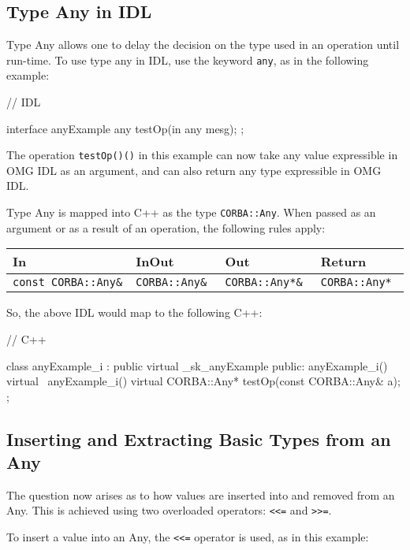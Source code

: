 \documentclass[11pt,twoside,a4paper]{book}
\newcommand{\type}[1]{\texttt{#1}}
\newcommand{\code}[1]{\texttt{#1}}
\newcommand{\op}[1]{\texttt{#1()}}
\begin{document}
\subsection{Type Any in IDL}
Type Any allows one to delay the decision on the type used in an
operation until run-time. To use type any in IDL, use the keyword
\code{any}, as in the following example:

\begin{idllisting}
// IDL

interface anyExample {
  any testOp(in any mesg);
};
\end{idllisting}


The operation \op{testOp()} in this example can now take any value
expressible in OMG IDL as an argument, and can also return any type
expressible in OMG IDL.

Type Any is mapped into C++ as the type \type{CORBA::Any}. When passed
as an argument or as a result of an operation, the following rules
apply:

\mbox{}

{\small
\begin{tabular}{llll}
{\bf In }                & {\bf InOut }       & {\bf Out }           & 
{\bf Return }                                                   \\ \hline
{\tt const CORBA::Any\& }& {\tt CORBA::Any\& }& {\tt CORBA::Any*\& } & 
{\tt CORBA::Any* }
\end{tabular}
}

\mbox{}

So, the above IDL would map to the following C++:

\begin{cxxlisting}
// C++

class anyExample_i : public virtual _sk_anyExample {
public:
  anyExample_i() { }
  virtual ~anyExample_i() { }
  virtual CORBA::Any* testOp(const CORBA::Any& a);
};
\end{cxxlisting}


\subsection{Inserting and Extracting Basic Types from an Any}

The question now arises as to how values are inserted into and removed
from an Any. This is achieved using two overloaded operators:
\code{<{}<=} and \code{>{}>=}.

To insert a value into an Any, the \code{<{}<=} operator is used, as
in this example:
\end{document}
